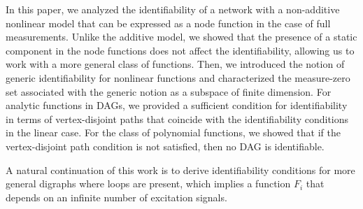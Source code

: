 \documentclass[letterpaper,10pt,journal]{IEEEtran}
\begin{document}
In this paper, we analyzed the identifiability of a network with a non-additive nonlinear model that can be expressed as a node function in the case of full measurements. Unlike the additive model, we showed that the presence of a static component in the node functions does not affect the identifiability, allowing us to work with a more general class of functions. 
Then, we introduced the notion of generic identifiability for nonlinear functions and characterized the measure-zero set associated with the generic notion as a subspace of finite dimension. For analytic functions in DAGs, we provided a sufficient condition for identifiability in terms of vertex-disjoint paths that coincide with the identifiability conditions in the linear case. For the class of polynomial functions, we showed that if the vertex-disjoint path condition is not satisfied, then no DAG is identifiable.


A natural continuation of this work is to derive identifiability conditions for more general digraphs where loops are present, which implies a function $F_i$ that depends on an infinite number of excitation signals. 





\end{document}

